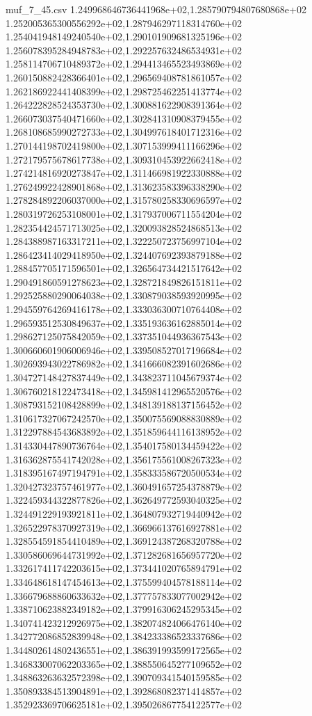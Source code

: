 \begin{filecontents*}{muf_7_45.csv}
1.249968646736441968e+02,1.285790794807680868e+02
1.252005365300556292e+02,1.287946297118314760e+02
1.254041948149240540e+02,1.290101909681325196e+02
1.256078395284948783e+02,1.292257632486534931e+02
1.258114706710489372e+02,1.294413465523493869e+02
1.260150882428366401e+02,1.296569408781861057e+02
1.262186922441408399e+02,1.298725462251413774e+02
1.264222828524353730e+02,1.300881622908391364e+02
1.266073037540471660e+02,1.302841310908379455e+02
1.268108685990272733e+02,1.304997618401712316e+02
1.270144198702419800e+02,1.307153999411166296e+02
1.272179575678617738e+02,1.309310453922662418e+02
1.274214816920273847e+02,1.311466981922330888e+02
1.276249922428901868e+02,1.313623583396338290e+02
1.278284892206037000e+02,1.315780258330696597e+02
1.280319726253108001e+02,1.317937006711554204e+02
1.282354424571713025e+02,1.320093828524868513e+02
1.284388987163317211e+02,1.322250723756997104e+02
1.286423414029418950e+02,1.324407692393879188e+02
1.288457705171596501e+02,1.326564734421517642e+02
1.290491860591278623e+02,1.328721849826151811e+02
1.292525880290064038e+02,1.330879038593920995e+02
1.294559764269416178e+02,1.333036300710764408e+02
1.296593512530849637e+02,1.335193636162885014e+02
1.298627125075842059e+02,1.337351044936367543e+02
1.300660601906006946e+02,1.339508527017196684e+02
1.302693943022786982e+02,1.341666082391602686e+02
1.304727148427837449e+02,1.343823711045679374e+02
1.306760218122473418e+02,1.345981412965520576e+02
1.308793152108428899e+02,1.348139188137156452e+02
1.310617327067242570e+02,1.350075569088830889e+02
1.312297884543683892e+02,1.351859644116138952e+02
1.314330447890736764e+02,1.354017580134459422e+02
1.316362875541742028e+02,1.356175561008267323e+02
1.318395167497194791e+02,1.358333586720500534e+02
1.320427323757461977e+02,1.360491657254378879e+02
1.322459344322877826e+02,1.362649772593040325e+02
1.324491229193921811e+02,1.364807932719440942e+02
1.326522978370927319e+02,1.366966137616927881e+02
1.328554591854410489e+02,1.369124387268320788e+02
1.330586069644731992e+02,1.371282681656957720e+02
1.332617411742203615e+02,1.373441020765894791e+02
1.334648618147454613e+02,1.375599404578188114e+02
1.336679688860633632e+02,1.377757833077002942e+02
1.338710623882349182e+02,1.379916306245295345e+02
1.340741423212926975e+02,1.382074824066476140e+02
1.342772086852839948e+02,1.384233386523337686e+02
1.344802614802436551e+02,1.386391993599172565e+02
1.346833007062203365e+02,1.388550645277109652e+02
1.348863263632572398e+02,1.390709341540159585e+02
1.350893384513904891e+02,1.392868082371414857e+02
1.352923369706625181e+02,1.395026867754122577e+02

\end{filecontents*}
